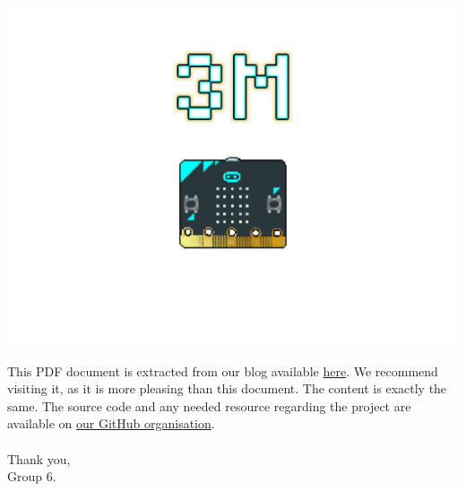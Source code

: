 \documentclass[11pt,a4paper]{article}
\begin{document}
\pagecolor{background}
\color{white}
\begin{center}
\includegraphics[scale=0.09]{logo.png}
\end{center}
This PDF document is extracted from our blog available \textcolor{link}{\href{https://micro-bit-final-project.github.io/}{here}}. We recommend visiting it, as it is more pleasing than this document. The content is exactly the same. The source code and any needed resource regarding the project are available on \textcolor{link}{\href{https://github.com/Micro-bit-final-project/}{our GitHub organisation}}.\\\\
Thank you,\\
Group 6.
\end{document}
